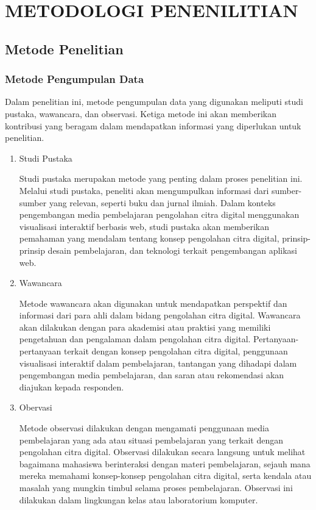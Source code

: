 \chapter{METODOLOGI PENENILITIAN}
\section{Metode Penelitian}
\subsection{Metode Pengumpulan Data}

Dalam penelitian ini, metode pengumpulan data yang digunakan meliputi studi pustaka, wawancara, dan observasi. Ketiga metode ini akan memberikan kontribusi yang beragam dalam mendapatkan informasi yang diperlukan untuk penelitian.

\begin{enumerate}[leftmargin=1cm, itemindent=0.6cm,labelwidth=15pt, labelsep=5pt, listparindent=1cm,align=left]

    \item Studi Pustaka

    Studi pustaka merupakan metode yang penting dalam proses penelitian ini. Melalui studi pustaka, peneliti akan mengumpulkan informasi dari sumber-sumber yang relevan, seperti buku dan jurnal ilmiah. Dalam konteks pengembangan media pembelajaran pengolahan citra digital menggunakan visualisasi interaktif berbasis web, studi pustaka akan memberikan pemahaman yang mendalam tentang konsep pengolahan citra digital, prinsip-prinsip desain pembelajaran, dan teknologi terkait pengembangan aplikasi web.

    \item Wawancara

    Metode wawancara akan digunakan untuk mendapatkan perspektif dan informasi dari para ahli dalam bidang pengolahan citra digital. Wawancara akan dilakukan dengan para akademisi atau praktisi yang memiliki pengetahuan dan pengalaman dalam pengolahan citra digital. Pertanyaan-pertanyaan terkait dengan konsep pengolahan citra digital, penggunaan visualisasi interaktif dalam pembelajaran, tantangan yang dihadapi dalam pengembangan media pembelajaran, dan saran atau rekomendasi akan diajukan kepada responden.

    \item Obervasi

    Metode observasi dilakukan dengan mengamati penggunaan media pembelajaran yang ada atau situasi pembelajaran yang terkait dengan pengolahan citra digital. Observasi dilakukan secara langsung untuk melihat bagaimana mahasiswa berinteraksi dengan materi pembelajaran, sejauh mana mereka memahami konsep-konsep pengolahan citra digital, serta kendala atau masalah yang mungkin timbul selama proses pembelajaran. Observasi ini dilakukan dalam lingkungan kelas atau laboratorium komputer.

\end{enumerate}

